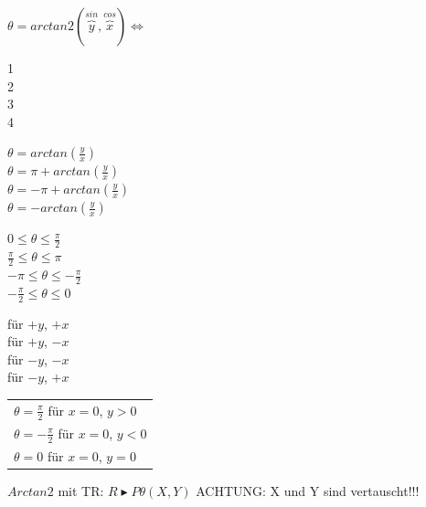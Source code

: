 	\begin{minipage}{4cm}
    	\vspace{8mm}
    	$\theta=arctan2(\overbrace{y}^{sin},\overbrace{x}^{cos}) \Leftrightarrow$
    \end{minipage}
	\begin{minipage}[t]{0.8cm}
    	\textcircled{1}\\
    	\textcircled{2}\\
    	\textcircled{3}\\
    	\textcircled{4}
    \end{minipage}
	\begin{minipage}[t]{3.5cm}
    	$\theta= arctan(\frac{y}{x})$\\
    	$\theta= \pi + arctan(\frac{y}{x})$\\
    	$\theta= -\pi + arctan(\frac{y}{x})$\\
    	$\theta= -arctan(\frac{y}{x})$\\
    \end{minipage}
	\begin{minipage}[t]{2.5cm}
    	\hspace{2mm} $0 \leq \theta \leq \frac{\pi}{2}$\\
    	\hspace*{1.5mm} $\frac{\pi}{2} \leq \theta \leq \pi$\\
    	$-\pi \leq \theta \leq -\frac{\pi}{2}$\\
    	$-\frac{\pi}{2} \leq \theta \leq 0$
    \end{minipage}
	\begin{minipage}[t]{2.5cm}
    	für $+y$, $+x$\\
    	für $+y$, $-x$\\
    	für $-y$, $-x$\\
    	für $-y$, $+x$
    \end{minipage}
	\begin{minipage}[t]{4cm}
     	\begin{tabular}[t]{|l}
    	$\theta = \frac{\pi}{2}$ für $x=0$, $y>0$\\
    	$\theta = - \frac{\pi}{2}$ für $x=0$, $y<0$\\
    	$\theta = 0$ für $x=0$, $y=0$\\
    	\end{tabular}
    \end{minipage}

$Arctan2$ mit TR: \texttt{$R \blacktriangleright P \theta (X,Y)$}
\hspace{2cm} {\color{red} ACHTUNG: X und Y sind vertauscht!!!}


